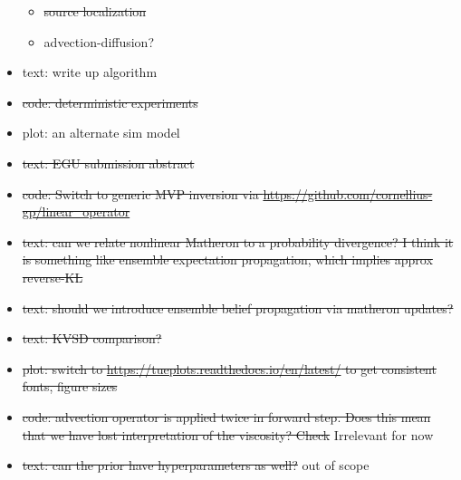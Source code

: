 \documentclass{article}
\theoremstyle{plain}
\theoremstyle{definition}
\theoremstyle{remark}
\begin{document}
\begin{itemize}
\begin{itemize}
        \item \sout{source localization}
        \item advection-diffusion?
    \end{itemize}
    \item text: write up algorithm
    \item \sout{code: deterministic experiments}
    \item plot: an alternate sim model
    \item \sout{text: EGU submission abstract}
    \item \sout{code: Switch to generic MVP inversion via \url{https://github.com/cornellius-gp/linear_operator}}
    \item \sout{text: can we relate nonlinear Matheron to a probability divergence? I think it is something like ensemble expectation propagation, which implies approx reverse-KL}
    \item \sout{text: should we introduce ensemble belief propagation via matheron updates?}
    \item \sout{text: KVSD comparison?}
    \item \sout{plot: switch to \url{https://tueplots.readthedocs.io/en/latest/} to get consistent fonts, figure sizes}
    \item \sout{code: advection operator is applied twice in forward step. Does this mean that we have lost interpretation of the viscosity? Check} Irrelevant for now
    \item \sout{text: can the prior have hyperparameters as well?} out of scope
\end{itemize}
\fi
\end{document}
